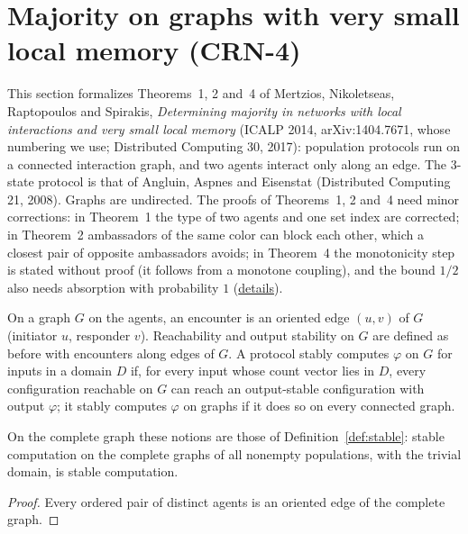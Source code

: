 \section{Majority on graphs with very small local memory (CRN-4)}\label{sec:mnrs-graph-majority}
This section formalizes Theorems~1, 2 and~4 of Mertzios, Nikoletseas, Raptopoulos and Spirakis,
\emph{Determining majority in networks with local interactions and very small local memory}
(ICALP 2014, arXiv:1404.7671, whose numbering we use; Distributed Computing 30, 2017): population
protocols run on a connected interaction graph, and two agents interact only along an edge. The
3-state protocol is that of Angluin, Aspnes and Eisenstat (Distributed Computing 21, 2008).
Graphs are undirected. The proofs of Theorems~1, 2 and~4 need minor corrections: in Theorem~1 the
type of two agents and one set index are corrected; in Theorem~2 ambassadors of the same color can
block each other, which a closest pair of opposite ambassadors avoids; in Theorem~4 the
monotonicity step is stated without proof (it follows from a monotone coupling), and the bound
$1/2$ also needs absorption with probability $1$
(\href{https://github.com/formal-dynamics/leanamics/blob/main/crn/FORMALIZATION_DIFFERENCES.md#majority-on-graphs-with-very-small-local-memory-graphmajority-crn-4}{details}).

\begin{definition}\label{def:graph-stable}
\leanok{}
On a graph $G$ on the agents, an encounter is an oriented edge $(u, v)$ of $G$ (initiator $u$,
responder $v$). Reachability and output stability on $G$ are defined as before with encounters
along edges of $G$. A protocol stably computes $\varphi$ on $G$ for inputs in a domain $D$ if, for
every input whose count vector lies in $D$, every configuration reachable on $G$ can reach an
output-stable configuration with output $\varphi$; it stably computes $\varphi$ on graphs if it
does so on every connected graph.
\end{definition}

\begin{lemma}\label{lem:graph-top}
\leanok{}
On the complete graph these notions are those of Definition~\ref{def:stable}: stable
computation on the complete graphs of all nonempty populations, with the trivial domain, is
stable computation.
\end{lemma}
\begin{proof}\leanok
Every ordered pair of distinct agents is an oriented edge of the complete graph.
\end{proof}

